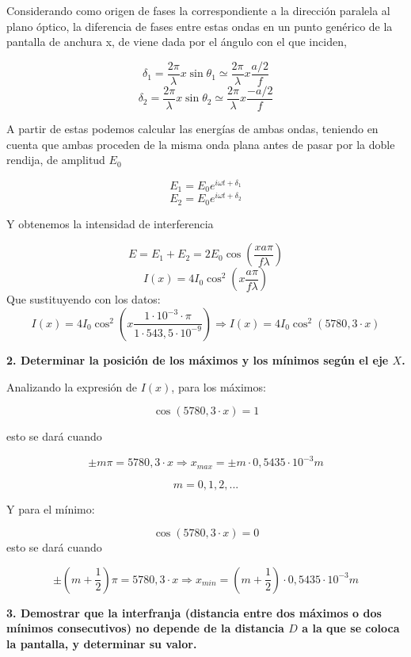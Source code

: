 \documentclass[a4paper,12pt,spanish]{article}
\begin{document}
Considerando como origen de fases la correspondiente a la dirección paralela al plano óptico, la diferencia de fases entre estas ondas en un punto genérico de la pantalla de anchura x, de viene dada por el ángulo con el que inciden,

\[ \delta_1 = \frac{2\pi}{\lambda} x \sin\theta_1 \simeq  \frac{2\pi}{\lambda} x \frac{a/2}{f}
\]
\[ \delta_2 = \frac{2\pi}{\lambda} x \sin\theta_2 \simeq  \frac{2\pi}{\lambda} x \frac{-a/2}{f}
\]

A partir de estas podemos calcular las energías de ambas ondas, teniendo en cuenta que ambas proceden de la misma onda plana antes de pasar por la doble rendija, de amplitud $E_0$

\[ E_1 = E_0 e^{i\omega t + \delta_1}
\]
\[ E_2 = E_0 e^{i\omega t + \delta_2}
\]

Y obtenemos la  intensidad de interferencia

\[ E = E_1 + E_2 = 2 E_0 \cos\left(\frac{xa\pi}{f\lambda}\right)
\]
\[  I(x) = 4 I_0 \cos^2\left(x\frac{a\pi}{f\lambda}\right)
\]
Que sustituyendo con los datos:
\[  I(x) = 4 I_0 \cos^2\left(x\frac{1\cdot10^{-3}\cdot\pi}{1 \cdot 543,5 \cdot10^{-9} }\right) \Longrightarrow  \boxed{ I(x) = 4 I_0 \cos^2 \left( 5780,3\cdot  x  \right)}
\]

\vspace{\baselineskip}
\textbf{ 2. Determinar la posición de los máximos y los mínimos según el eje $X$.
}
\vspace{\baselineskip}


Analizando la expresión de $I(x)$, para los máximos:

\[ \cos \left( 5780,3\cdot  x  \right) = 1
\]

esto se dará cuando 

\[ \pm m \pi  =  5780,3\cdot  x \Longrightarrow \boxed{ x_{max} = \pm m \cdot0,5435\cdot 10^{-3} \si{m} }
\]

\[ m = 0, 1, 2, ...
\]

Y para el mínimo:

\[ \cos \left( 5780,3\cdot  x  \right) = 0
\]
esto se dará cuando 

\[ \pm \left(m+\frac{1}{2}\right) \pi  =  5780,3\cdot  x \Longrightarrow \boxed{ x_{min} = \left(m+\frac{1}{2}\right) \cdot0,5435\cdot 10^{-3} \si{m} } 
\]







\vspace{\baselineskip}
\textbf{ 3. Demostrar que la interfranja (distancia entre dos máximos o dos mínimos
	consecutivos) no depende de la distancia $D$ a la que se coloca la pantalla,
	y determinar su valor.
}
\vspace{\baselineskip}
\end{document}
